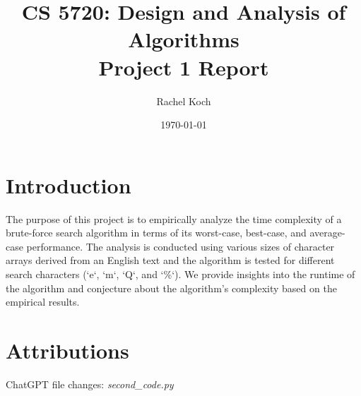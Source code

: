 \documentclass{article}
\title{CS 5720: Design and Analysis of Algorithms \\ Project 1 Report}
\author{Rachel Koch}
\date{\today}
\begin{document}
\maketitle

\section{Introduction}

The purpose of this project is to empirically analyze the time complexity of a brute-force search algorithm in terms of its worst-case, best-case, and average-case performance. The analysis is conducted using various sizes of character arrays derived from an English text and the algorithm is tested for different search characters (`e`, `m`, `Q`, and `\%`). We provide insights into the runtime of the algorithm and conjecture about the algorithm’s complexity based on the empirical results.

\section{Attributions}

ChatGPT file changes: \textit{second\_code.py}
\end{document}

